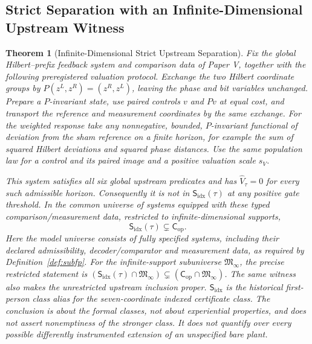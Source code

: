 \documentclass[11pt,a4paper]{article}
\newtheorem{theorem}{Theorem}[section]
\theoremstyle{definition}
\newcommand{\Cop}{\mathsf{C}_{\mathrm{op}}}
\newcommand{\Subfp}{\mathsf{S}_{\mathrm{idx}}}
\newcommand{\ValAsym}{V}
\begin{document}
\subsection{Strict Separation with an Infinite-Dimensional Upstream Witness}

\begin{theorem}[Infinite-Dimensional Strict Upstream Separation]\label{thm:infinite-strict-upstream-separation}
Fix the global Hilbert--prefix feedback system and comparison data of Paper V, together with the following preregistered valuation protocol. Exchange the two Hilbert coordinate groups by $P(z^L,z^R)=(z^R,z^L)$, leaving the phase and bit variables unchanged. Prepare a $P$-invariant state, use paired controls $v$ and $Pv$ at equal cost, and transport the reference and measurement coordinates by the same exchange. For the weighted response take any nonnegative, bounded, $P$-invariant functional of deviation from the sham reference on a finite horizon, for example the sum of squared Hilbert deviations and squared phase distances. Use the same population law for a control and its paired image and a positive valuation scale $s_V$.

This system satisfies all six global upstream predicates and has $\widehat{\ValAsym}_\tau=0$ for every such admissible horizon. Consequently it is not in $\Subfp(\tau)$ at any positive gate threshold. In the common universe of systems equipped with these typed comparison/measurement data, restricted to infinite-dimensional supports,
\[
 \Subfp(\tau)\subsetneq\Cop.
\]
Here the model universe consists of fully specified systems, including their declared admissibility, decoder/comparator and measurement data, as required by Definition~\ref{def:subfp}. For the infinite-support subuniverse $\mathfrak M_\infty$, the precise restricted statement is $(\Subfp(\tau)\cap\mathfrak M_\infty)\subsetneq(\Cop\cap\mathfrak M_\infty)$. The same witness also makes the unrestricted upstream inclusion proper. $\Subfp$ is the historical first-person class alias for the seven-coordinate indexed certificate class. The conclusion is about the formal classes, not about experiential properties, and does not assert nonemptiness of the stronger class. It does not quantify over every possible differently instrumented extension of an unspecified bare plant.
\end{theorem}
\end{document}
